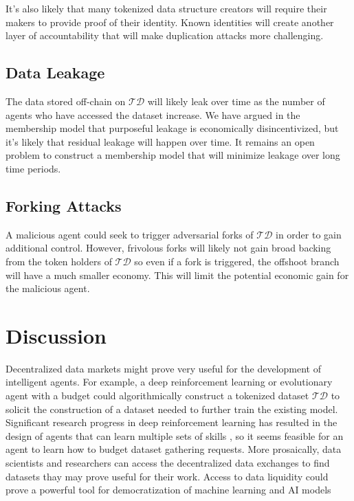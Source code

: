 \documentclass{llncs}
\begin{document}
It's also likely that many tokenized data structure creators will require their makers to provide proof of their identity. Known identities will create another layer of accountability that will make duplication attacks more challenging.

\subsection{Data Leakage}

The data stored off-chain on $\mathcal{TD}$ will likely leak over time as the number of agents who have accessed the dataset increase. We have argued in the membership model that purposeful leakage is economically disincentivized, but it's likely that residual leakage will happen over time. It remains an open problem to construct a membership model that will minimize leakage over long time periods.

\subsection{Forking Attacks}

A malicious agent could seek to trigger adversarial forks of $\mathcal{TD}$ in order to gain additional control. However, frivolous forks will likely not gain broad backing from the token holders of $\mathcal{TD}$ so even if a fork is triggered, the offshoot branch will have a much smaller economy. This will limit the potential economic gain for the malicious agent.


\section{Discussion}

Decentralized data markets might prove very useful for the development of intelligent agents. For example, a deep reinforcement learning \cite{mnih2015human} or evolutionary agent with a budget could algorithmically construct a tokenized dataset $\mathcal{TD}$ to solicit the construction of a dataset needed to further train the existing model. Significant research progress in deep reinforcement learning has resulted in the design of agents that can learn multiple sets of skills \cite{mankowitz2018unicorn}, so it seems feasible for an agent to learn how to budget dataset gathering requests. More prosaically, data scientists and researchers can access the decentralized data exchanges to find datasets thay may prove useful for their work. Access to data liquidity could prove a powerful tool for democratization of machine learning and AI models
\end{document}

